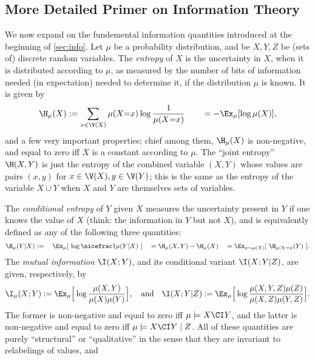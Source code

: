 \begin{subappendices}
\subsection{More Detailed Primer on Information Theory}
    \label{appendix:info-theory-primer}
We now expand on the fundemental information quantities introduced at the beginning of \cref{sec:info}.
Let $\mu$ be a probability distribution, and be $X,Y,Z$
    be (sets of) discrete random variables.
The \emph{entropy} of $X$ is the uncertainty in $X$, when it is distributed according to $\mu$, as measured by the number of bits of information needed (in expectation) needed to determine it, if the distribution $\mu$ is known.  It is given by 
\[
    \H_\mu(X) := \sum_{x \in \V(X)} \mu(X{=}x) \log \frac{1}{\mu(X{=}x)} \qquad= -\Ex_{\mu}[\log \mu(X)],
\]
and a few very important properties; chief among them, $\H_\mu(X)$ is non-negative, and equal to zero iff $X$ is a constant according to $\mu$. 
The ``joint entropy'' $\H(X,Y)$ is just the entropy of the combined variable $(X,Y)$ whose values are pairs $(x,y)$ for $x \in \V(X),y \in \V(Y)$; this is the same as the entropy of the variable $X \cup Y$ when $X$ and $Y$ are themselves sets of variables. 

The \emph{conditional entropy} of $Y$ given $X$
measures the uncertainty present in $Y$ if one knows the value of $X$
(think: the information in $Y$ but not $X$),
and is equivalently defined as any of the following three quantities:
\[
\H_\mu( Y | X) :=
        \quad
    \Ex_{\mu} [~\log \nicefrac1{\mu(Y | X)}~]
        \quad
    =\H_\mu(X,Y) - \H_\mu(X)
        \quad
    =\Ex_{x \sim \mu(X)} [~\H_{\mu \mid X{=}x}(Y)~]    
.
\]
The \emph{mutual information} $\I(X;Y)$,
and its conditional variant $\I(X;Y|Z)$, 
are given, respectively, by
\[
    \I_\mu(X;Y) :=
        \Ex_{\mu} \Big[ \log \frac{\mu(X,Y)}{\mu(X) \mu(Y)}\Big],
    \quad\text{and}\quad
    \I(X;Y|Z):= 
        \Ex_{\mu} \Big[ \log \frac{\mu(X,Y,Z)\mu(Z)}{\mu(X,Z) \mu(Y,Z)}\Big].
\]
The former is non-negative and equal to zero iff $\mu \models X \CI Y$, and the latter is non-negative and equal to zero iff $\mu \models X \CI Y \mid Z$. 
All of these quantities are purely ``structural'' or ``qualitative'' in the sense that they are invariant to relabelings of values, and 


\end{subappendices}
